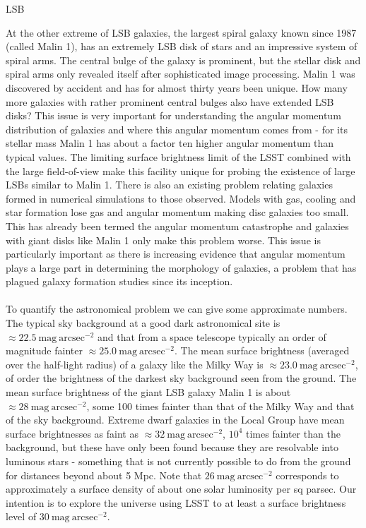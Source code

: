 {\begin{tasklist}{LSB}
\begin{task}
{At the other extreme of LSB galaxies, the largest spiral galaxy known since 1987 (called Malin 1), has an extremely LSB disk of stars and an impressive system of spiral arms. The central bulge of the galaxy is prominent, but the stellar disk and spiral arms only revealed itself after sophisticated image processing. Malin 1 was discovered by accident and has for almost thirty years been unique. How many more galaxies with rather prominent central bulges also have extended LSB disks? This issue is very important for understanding the angular momentum distribution of galaxies and where this angular momentum comes from - for its stellar mass Malin 1 has about a factor ten higher angular momentum than typical values. The limiting surface brightness limit of the LSST combined with the large field-of-view make this facility unique for probing the existence of large LSBs similar to Malin 1. There is also an existing problem relating galaxies formed in numerical simulations to those observed. Models with gas, cooling and star formation lose gas and angular momentum making disc galaxies too small. This has already been termed the angular momentum catastrophe and galaxies with giant disks like Malin 1 only make this problem worse. This issue is particularly important as there is increasing evidence that angular momentum plays a large part in determining the morphology of galaxies, a problem that has plagued galaxy formation studies since its inception.\\  
~\\
To quantify the astronomical problem we can give some approximate numbers. The typical sky background at a good dark astronomical site is $\approx22.5~\mathrm{mag}~\mathrm{arcsec}^{-2}$ and that from a space telescope typically an order of magnitude fainter $\approx25.0~\mathrm{mag}~\mathrm{arcsec}^{-2}$. The mean surface brightness (averaged over the half-light radius) of a galaxy like the Milky Way is $\approx23.0~\mathrm{mag}~\mathrm{arcsec}^{-2}$, of order the brightness of the darkest sky background seen from the ground. The mean surface brightness of the giant LSB galaxy Malin 1 is about $\approx28~\mathrm{mag}~\mathrm{arcsec}^{-2}$, some 100 times fainter than that of the Milky Way and that of the sky background. Extreme dwarf galaxies in the Local Group have mean surface brightnesses as faint as $\approx32~\mathrm{mag}~\mathrm{arcsec}^{-2}$, $10^4$ times fainter than the background, but these have only been found because they are resolvable into luminous stars - something that is not currently possible to do from the ground for distances beyond about 5 Mpc. Note that $26~\mathrm{mag}~\mathrm{arcsec}^{-2}$ corresponds to approximately a surface density of about one solar luminosity per sq parsec. Our intention is to explore the universe using LSST to at least a surface brightness level of $30~\mathrm{mag}~\mathrm{arcsec}^{-2}$.
}
\end{task}
\end{tasklist}}

